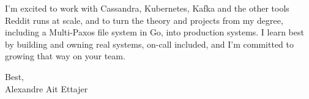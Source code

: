 \documentclass{article}
\begin{document}
I'm excited to work with Cassandra, Kubernetes, Kafka and the other tools Reddit runs at scale, and to turn the theory and projects from my degree, including a Multi-Paxos file system in Go, into production systems.
I learn best by building and owning real systems, on-call included, and I'm committed to growing that way on your team.

Best, \\
Alexandre Ait Ettajer
\end{document}
